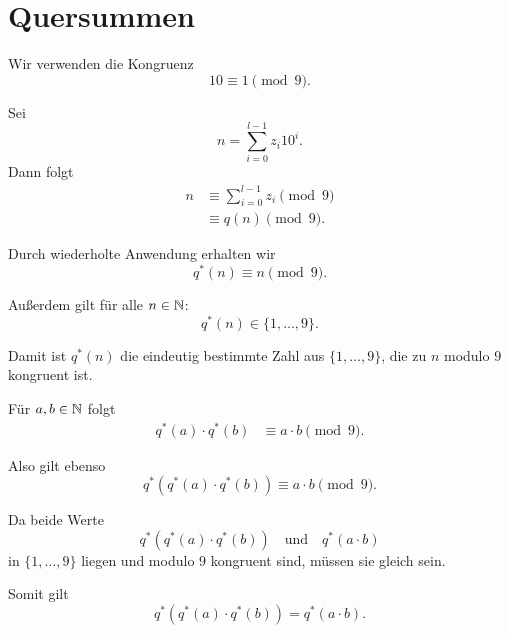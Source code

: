 \documentclass{report}
\begin{document}
\section{Quersummen}



\begin{myproof}
  Wir verwenden die Kongruenz
  \[
    10\equiv1\pmod9.
  \]

  Sei
  \[
    n=\sum_{i=0}^{l-1}z_i10^i.
  \]
  Dann folgt
  \begin{align*}
    n
    &\equiv\sum_{i=0}^{l-1}z_i
      \pmod9\\
    &\equiv q(n)\pmod9.
  \end{align*}

  Durch wiederholte Anwendung erhalten wir
  \[
    q^*(n)\equiv n\pmod9.
  \]

  Außerdem gilt für alle $n\in\mathbb{N}$:
  \[
    q^*(n)\in\{1,\dots,9\}.
  \]

  Damit ist $q^*(n)$ die eindeutig bestimmte
  Zahl aus $\{1,\dots,9\}$, die zu $n$
  modulo $9$ kongruent ist.

  Für $a,b\in\mathbb{N}$ folgt
  \begin{align*}
    q^*(a)\cdot q^*(b)
    &\equiv a\cdot b\pmod9.
  \end{align*}

  Also gilt ebenso
  \[
    q^*(q^*(a)\cdot q^*(b))
    \equiv a\cdot b\pmod9.
  \]

  Da beide Werte
  \[
    q^*(q^*(a)\cdot q^*(b))
    \quad\text{und}\quad
    q^*(a\cdot b)
  \]
  in $\{1,\dots,9\}$ liegen und modulo $9$
  kongruent sind, müssen sie gleich sein.

  Somit gilt
  \[
    \boxed{
      q^*(q^*(a)\cdot q^*(b))
      =q^*(a\cdot b).
    }
  \]
\end{myproof}
\end{document}

